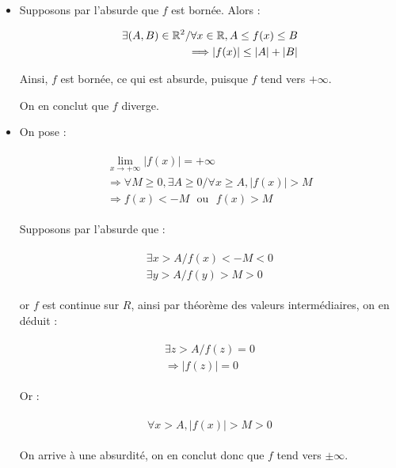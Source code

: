 \documentclass{article}
\begin{document}
\begin{itemize}
    \item Supposons par l'absurde que $f$ est bornée. Alors :
    
    \begin{align*}\begin{split}
        \exists(A, B)\in\mathbb{R}^2 / \forall x\in\mathbb{R}, A\leq f(x)\leq B\\
        \Longrightarrow  |f(x)| \leq |A|+|B|
    \end{split}\end{align*}
        
    Ainsi, $f$ est bornée, ce qui est absurde, puisque $f$ tend vers $+\infty$.

    On en conclut que $f$ diverge.


    \item On pose :
    
    \begin{align*}\begin{split}
        \lim_{x\rightarrow+\infty}|f(x)|=+\infty\\
        \Longrightarrow \forall M\geq0,\exists A\ge0/\forall x\ge A,|f(x)|>M\\
        \Longrightarrow f(x)<-M ~~~\text{ou}~~~ f(x)>M
    \end{split}\end{align*}

    Supposons par l'absurde que :

    \begin{align*}\begin{split}
        \exists x>A/f(x)<-M<0\\
        \exists y>A/f(y)>M>0
    \end{split}\end{align*}

    or $f$ est continue sur $R$, ainsi par théorème des valeurs intermédiaires, on en déduit :

    \begin{align*}\begin{split}
        \exists z>A/f(z)=0\\
        \Longrightarrow \boxed{|f(z)|=0}
    \end{split}\end{align*}
    
    Or :


    \begin{align*}\begin{split}
        \forall x>A, \boxed{|f(x)|>M>0}
    \end{split}\end{align*}

    On arrive à une absurdité, on en conclut donc que $f$ tend vers $\pm\infty$.
\end{itemize}
\end{document}
